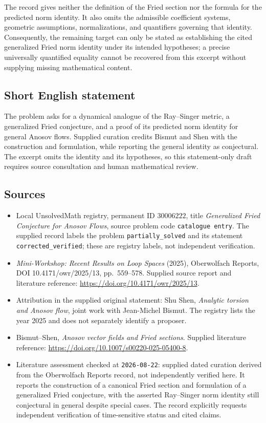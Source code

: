 \documentclass[11pt]{article}
\begin{document}
The record gives neither the definition of the Fried section nor the formula for the predicted norm identity. It also omits the admissible coefficient systems, geometric assumptions, normalizations, and quantifiers governing that identity. Consequently, the remaining target can only be stated as establishing the cited generalized Fried norm identity under its intended hypotheses; a precise universally quantified equality cannot be recovered from this excerpt without supplying missing mathematical content.
\subsection{Short English statement}
The problem asks for a dynamical analogue of the Ray--Singer metric, a generalized Fried conjecture, and a proof of its predicted norm identity for general Anosov flows. Supplied curation credits Bismut and Shen with the construction and formulation, while reporting the general identity as conjectural. The excerpt omits the identity and its hypotheses, so this statement-only draft requires source consultation and human mathematical review.
\subsection{Sources}
\begin{itemize}
\item Local UnsolvedMath registry, permanent ID \(30006222\), title \emph{Generalized Fried Conjecture for Anosov Flows}, source problem code \texttt{catalogue entry}. The supplied record labels the problem \texttt{partially\_solved} and its statement \texttt{corrected\_verified}; these are registry labels, not independent verification.
\item \emph{Mini-Workshop: Recent Results on Loop Spaces} (2025), Oberwolfach Reports, DOI 10.4171/owr/2025/13, pp.~559--578. Supplied source report and literature reference: \url{https://doi.org/10.4171/owr/2025/13}.
\item Attribution in the supplied original statement: Shu Shen, \emph{Analytic torsion and Anosov flow}, joint work with Jean-Michel Bismut. The registry lists the year 2025 and does not separately identify a proposer.
\item Bismut--Shen, \emph{Anosov vector fields and Fried sections}. Supplied literature reference: \url{https://doi.org/10.1007/s00220-025-05400-8}.
\item Literature assessment checked at \texttt{2026-08-22}: supplied dated curation derived from the Oberwolfach Reports record, not independently verified here. It reports the construction of a canonical Fried section and formulation of a generalized Fried conjecture, with the asserted Ray--Singer norm identity still conjectural in general despite special cases. The record explicitly requests independent verification of time-sensitive status and cited claims.
\end{itemize}
\end{document}
